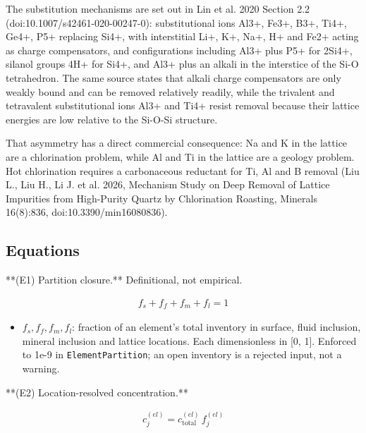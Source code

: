 \documentclass[10pt,a4paper,twoside]{report}
\begin{document}
The substitution mechanisms are set out in Lin et al. 2020 Section 2.2 (doi:10.1007/s42461-020-00247-0): substitutional ions Al3+, Fe3+, B3+, Ti4+, Ge4+, P5+ replacing Si4+, with interstitial Li+, K+, Na+, H+ and Fe2+ acting as charge compensators, and configurations including Al3+ plus P5+ for 2Si4+, silanol groups 4H+ for Si4+, and Al3+ plus an alkali in the interstice of the Si-O tetrahedron. The same source states that alkali charge compensators are only weakly bound and can be removed relatively readily, while the trivalent and tetravalent substitutional ions Al3+ and Ti4+ resist removal because their lattice energies are low relative to the Si-O-Si structure.

That asymmetry has a direct commercial consequence: Na and K in the lattice are a chlorination problem, while Al and Ti in the lattice are a geology problem. Hot chlorination requires a carbonaceous reductant for Ti, Al and B removal (Liu L., Liu H., Li J. et al. 2026, Mechanism Study on Deep Removal of Lattice Impurities from High-Purity Quartz by Chlorination Roasting, Minerals 16(8):836, doi:10.3390/min16080836).

\subsection*{Equations}

**(E1) Partition closure.** Definitional, not empirical.

\begin{equation*}
\begin{gathered}
f_{s} + f_{f} + f_{m} + f_{l} = 1
\end{gathered}
\end{equation*}

\begin{itemize}
\item $f_s, f_f, f_m, f_l$: fraction of an element's total inventory in surface, fluid inclusion, mineral inclusion and lattice locations. Each dimensionless in [0, 1]. Enforced to 1e-9 in \texttt{ElementPartition}; an open inventory is a rejected input, not a warning.
\end{itemize}

**(E2) Location-resolved concentration.**

\begin{equation*}
\begin{gathered}
c_{j}^{(el)} = c_{\text{total}}^{(el)} \, f_{j}^{(el)}
\end{gathered}
\end{equation*}
\end{document}
